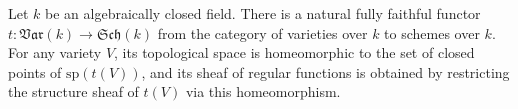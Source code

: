 Let $k$ be an algebraically closed field. There is a natural fully faithful functor $t: \mathfrak{Var}(k) \rightarrow \mathfrak{Sch}(k)$ from the category of varieties over $k$ to schemes over $k$. For any variety $V$, its topological space is homeomorphic to the set of closed points of $\text{sp}(t(V))$, and its sheaf of regular functions is obtained by restricting the structure sheaf of $t(V)$ via this homeomorphism.
